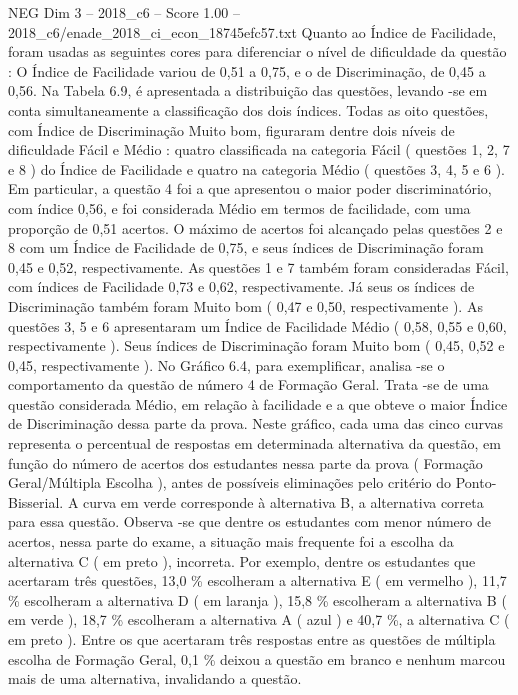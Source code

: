 \begin{textsample}{NEG Dim 3 – 2018\_c6 – Score 1.00 – 2018\_c6/enade\_2018\_ci\_econ\_18745efc57.txt}
Quanto ao Índice de Facilidade, foram usadas as seguintes cores para diferenciar o nível de dificuldade da questão : O Índice de Facilidade variou de 0,51 a 0,75, e o de Discriminação, de 0,45 a 0,56.
Na Tabela 6.9, é apresentada a distribuição das questões, levando -se em conta simultaneamente a classificação dos dois índices.
Todas as oito questões, com Índice de Discriminação Muito bom, figuraram dentre dois níveis de dificuldade Fácil e Médio : quatro classificada na categoria Fácil ( questões 1, 2, 7 e 8 ) do Índice de Facilidade e quatro na categoria Médio ( questões 3, 4, 5 e 6 ).
Em particular, a questão 4 foi a que apresentou o maior poder discriminatório, com índice 0,56, e foi considerada Médio em termos de facilidade, com uma proporção de 0,51 acertos.
O máximo de acertos foi alcançado pelas questões 2 e 8 com um Índice de Facilidade de 0,75, e seus índices de Discriminação foram 0,45 e 0,52, respectivamente.
As questões 1 e 7 também foram consideradas Fácil, com índices de Facilidade 0,73 e 0,62, respectivamente.
Já seus os índices de Discriminação também foram Muito bom ( 0,47 e 0,50, respectivamente ).
As questões 3, 5 e 6 apresentaram um Índice de Facilidade Médio ( 0,58, 0,55 e 0,60, respectivamente ).
Seus índices de Discriminação foram Muito bom ( 0,45, 0,52 e 0,45, respectivamente ).
No Gráfico 6.4, para exemplificar, analisa -se o comportamento da questão de número 4 de Formação Geral.
Trata -se de uma questão considerada Médio, em relação à facilidade e a que obteve o maior Índice de Discriminação dessa parte da prova.
Neste gráfico, cada uma das cinco curvas representa o percentual de respostas em determinada alternativa da questão, em função do número de acertos dos estudantes nessa parte da prova ( Formação Geral/Múltipla Escolha ), antes de possíveis eliminações pelo critério do Ponto-Bisserial.
A curva em verde corresponde à alternativa B, a alternativa correta para essa questão.
Observa -se que dentre os estudantes com menor número de acertos, nessa parte do exame, a situação mais frequente foi a escolha da alternativa C ( em preto ), incorreta.
Por exemplo, dentre os estudantes que acertaram três questões, 13,0 \% escolheram a alternativa E ( em vermelho ), 11,7 \% escolheram a alternativa D ( em laranja ), 15,8 \% escolheram a alternativa B ( em verde ), 18,7 \% escolheram a alternativa A ( azul ) e 40,7 \%, a alternativa C ( em preto ).
Entre os que acertaram três respostas entre as questões de múltipla escolha de Formação Geral, 0,1 \% deixou a questão em branco e nenhum marcou mais de uma alternativa, invalidando a questão.

\end{textsample}
